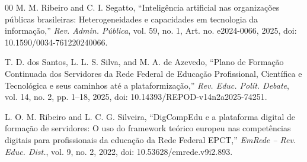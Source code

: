 \begin{thebibliography}{00}
 M. M. Ribeiro and C. I. Segatto, ``Intelig{\^e}ncia artificial nas organiza{\c{c}}{\~o}es p{\'u}blicas brasileiras: Heterogeneidades e capacidades em tecnologia da informa{\c{c}}{\~a}o,'' \emph{Rev. Admin. P{\'u}blica}, vol. 59, no. 1, Art. no. e2024-0066, 2025, doi: 10.1590/0034-761220240066.

 T. D. dos Santos, L. L. S. Silva, and M. A. de Azevedo, ``Plano de Forma{\c{c}}{\~a}o Continuada dos Servidores da Rede Federal de Educa{\c{c}}{\~a}o Profissional, Cient{\'i}fica e Tecnol{\'o}gica e seus caminhos at{\'e} a plataformiza{\c{c}}{\~a}o,'' \emph{Rev. Educ. Pol{\'i}t. Debate}, vol. 14, no. 2, pp. 1--18, 2025, doi: 10.14393/REPOD-v14n2a2025-74251.

 L. O. M. Ribeiro and L. C. G. Silveira, ``DigCompEdu e a plataforma digital de forma{\c{c}}{\~a}o de servidores: O uso do framework te{\'o}rico europeu nas compet{\^e}ncias digitais para profissionais da educa{\c{c}}{\~a}o da Rede Federal EPCT,'' \emph{EmRede -- Rev. Educ. Dist.}, vol. 9, no. 2, 2022, doi: 10.53628/emrede.v9i2.893.

\end{thebibliography}
